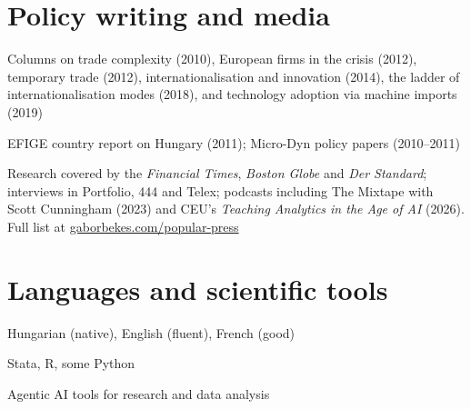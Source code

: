\documentclass[10pt,a4paper]{article}
\begin{document}
\section{Policy writing and media}
\begin{cvlist}
  \item[VoxEU] Columns on trade complexity (2010), European firms in the crisis (2012), temporary trade (2012), internationalisation and innovation (2014), the ladder of internationalisation modes (2018), and technology adoption via machine imports (2019)
  \item[Reports] EFIGE country report on Hungary (2011); Micro-Dyn policy papers (2010--2011)
  \item[Media] Research covered by the \textit{Financial Times}, \textit{Boston Globe} and \textit{Der Standard}; interviews in Portfolio, 444 and Telex; podcasts including The Mixtape with Scott Cunningham (2023) and CEU's \textit{Teaching Analytics in the Age of AI} (2026). Full list at \href{https://gaborbekes.com/popular-press/}{gaborbekes.com/popular-press}
\end{cvlist}

\section{Languages and scientific tools}
\begin{cvlist}
  \item[Languages] Hungarian (native), English (fluent), French (good)
  \item[Coding] Stata, R, some Python
  \item[AI] Agentic AI tools for research and data analysis
\end{cvlist}
\end{document}
